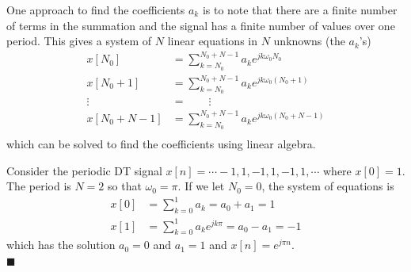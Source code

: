 One approach to find the coefficients $a_k$ is to note that there are a finite number of terms in the summation and the signal has a finite number of values over one period. This gives a system of $N$ linear equations in $N$ unknowns (the $a_k$'s)
\begin{align*}
  x[N_0] &= \sum\limits_{k = N_0}^{N_0 + N-1} a_k e^{jk\omega_0N_0}\\
  x[N_0+1] &= \sum\limits_{k = N_0}^{N_0 + N-1} a_k e^{jk\omega_0(N_0+1)}\\
  \vdots\hspace{2em} &= \hspace{2em}\vdots\\
  x[N_0+N-1] &= \sum\limits_{k = N_0}^{N_0 + N-1} a_k e^{jk\omega_0(N_0+N-1)}\\
\end{align*}
which can be solved to find the coefficients using linear algebra.

\begin{example}
  Consider the periodic DT signal $x[n] = \cdots -1, 1, -1, 1, -1, 1, \cdots$ where $x[0] = 1$. The period is $N=2$ so that $\omega_0 = \pi$. If we let $N_0 = 0$, the system of equations is
  \begin{align*}
    x[0] &= \sum\limits_{k = 0}^{1} a_k = a_0 + a_1 = 1\\
    x[1] &= \sum\limits_{k = 0}^{1} a_k e^{jk\pi} = a_0 - a_1 = -1
  \end{align*}
  which has the solution $a_0 = 0$ and $a_1 = 1$ and $x[n] = e^{j\pi n}$.\\
  $\blacksquare$
\end{example}

